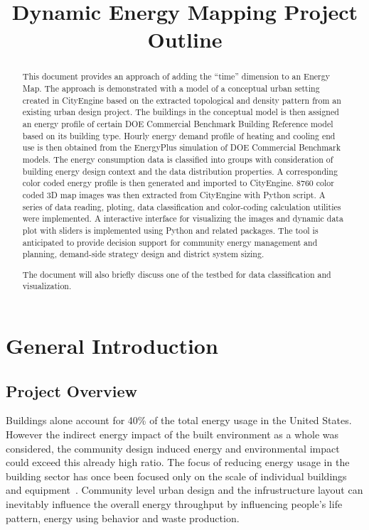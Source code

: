 \documentclass[hidelinks,12pt]{article}
\begin{document}
\title{Dynamic Energy Mapping Project Outline}
\maketitle
\tableofcontents
\newpage
\begin{abstract}
  This document provides an approach of adding the ``time'' dimension
  to an Energy Map. The approach is demonstrated with a model of a
  conceptual urban setting created in CityEngine based on the
  extracted topological and density pattern from an existing urban
  design project. The buildings in the conceptual model is then
  assigned an energy profile of certain DOE Commercial Benchmark
  Building Reference model based on its building type. Hourly energy
  demand profile of heating and cooling end use is then obtained from
  the EnergyPlus simulation of DOE Commercial Benchmark models. The
  energy consumption data is classified into groups with consideration
  of building energy design context and the data distribution
  properties. A corresponding color coded energy profile is then
  generated and imported to CityEngine. 8760 color coded 3D map images
  was then extracted from CityEngine with Python script. A series of
  data reading, ploting, data classification and color-coding
  calculation utilities were implemented. A interactive interface for
  visualizing the images and dynamic data plot with sliders is
  implemented using Python and related packages. The tool is
  anticipated to provide decision support for community energy
  management and planning, demand-side strategy design and district
  system sizing.
  
  The document will also briefly discuss one of the testbed for data
  classification and visualization.

\end{abstract}
\newpage

\section{General Introduction}
\subsection{Project Overview}
Buildings alone account for 40\% of the total energy usage in the
United States. However the indirect energy impact of the built
environment as a whole was considered, the community design induced
energy and environmental impact could exceed this already high
ratio. The focus of reducing energy usage in the building sector has
once been focused only on the scale of individual buildings and
equipment~\cite{Jaccard19971065}. Community level urban design and the
infrustructure layout can inevitably influence the overall energy
throughput by influencing people's life pattern, energy using behavior
and waste production.
\end{document}
